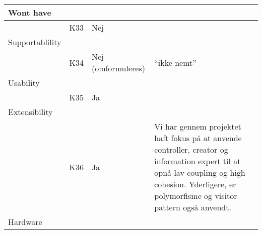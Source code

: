 \documentclass[class=article, crop=false]{standalone}
\begin{document}
\begin{table}[]
\begin{tabular}{|l|l|l|l|}
            Wont have       &          &                    &                                                                                                                                                                                                    \\ \hline
            & K33      & Nej                &                                                                                                                                                                                                    \\ \hline
            Supportablility &          &                    &                                                                                                                                                                                                    \\ \hline
            & K34      & Nej (omformuleres) & “ikke nemt”                                                                                                                                                                                        \\ \hline
            Usability       &          &                    &                                                                                                                                                                                                    \\ \hline
            & K35      & Ja                 &                                                                                                                                                                                                    \\ \hline
            Extensibility   &          &                    &                                                                                                                                                                                                    \\ \hline
            & K36      & Ja                 & Vi har gennem projektet haft fokus på at anvende controller, creator og information expert til at opnå lav coupling og high cohesion. Yderligere, er polymorfisme og visitor pattern også anvendt. \\ \hline
            Hardware        &          &                    &                                                                                                                                                                                                    \\ \hline

\end{tabular}
\end{table}
\end{document}
